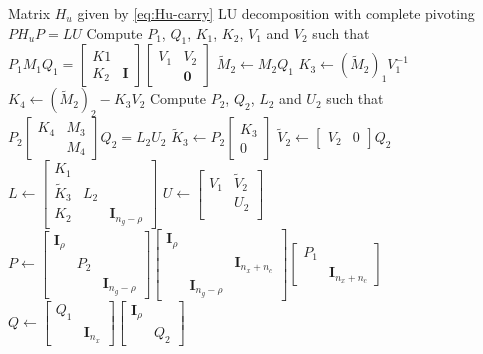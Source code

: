 \documentclass{article}
\begin{document}
\begin{algorithm}
    \caption{Blocked LU decomposition of lower triangular matrix $H_u$ with carry-over}
    \label{alg:blocked-lu-carry}
    \begin{algorithmic}
    \Require Matrix $H_u$ given by \eqref{eq:Hu-carry}
    \Ensure LU decomposition with complete pivoting $P H_u P = L U$
    \State Compute $P_1$, $Q_1$, $K_1$, $K_2$, $V_1$ and $V_2$ such that $P_1 M_1 Q_1 = \begin{bmatrix}K1 & \\ K_2 & \bm{I}\end{bmatrix} \begin{bmatrix} V_1 & V_2\\ & \bm{0}\end{bmatrix}$
    \State $\tilde{M}_2 \gets M_2 Q_1$
    \State $K_3 \gets (\tilde{M}_2)_1 V_1^{-1}$
    \State $K_4 \gets (\tilde{M}_2)_2 - K_3 V_2$
    \State Compute $P_2$, $Q_2$, $L_2$ and $U_2$ such that $P_2 \begin{bmatrix} K_4 & M_3\\ & M_4 \end{bmatrix} Q_2 = L_2 U_2$
    \State $\tilde{K}_3 \gets P_2 \begin{bmatrix} K_3\\ 0 \end{bmatrix}$
    \State $\tilde{V}_2 \gets \begin{bmatrix} V_2 & 0 \end{bmatrix} Q_2$
    \State $L \gets \begin{bmatrix} K_1 & & \\ \tilde{K}_3 & L_2 & \\ K_2 &  & \bm{I}_{n_g-\rho} \end{bmatrix}$
    \State $U \gets \begin{bmatrix} V_1 & \tilde{V}_2\\ & U_2\\ & \end{bmatrix}$
    \State $P \gets \begin{bmatrix} \bm{I}_\rho & & \\ & P_2 & \\ & & \bm{I}_{n_g-\rho} \end{bmatrix} \begin{bmatrix} \bm{I}_\rho & & \\ & & \bm{I}_{n_x+n_c} \\ & \bm{I}_{n_g-\rho} & \end{bmatrix} \begin{bmatrix} P_1 & \\ & \bm{I}_{n_x+n_c} \end{bmatrix}$
    \State $Q \gets \begin{bmatrix} Q_1 & \\ & \bm{I}_{n_x}\end{bmatrix} \begin{bmatrix}\bm{I}_\rho &\\ & Q_2 \end{bmatrix}$

    \end{algorithmic}
\end{algorithm}
\end{document}
